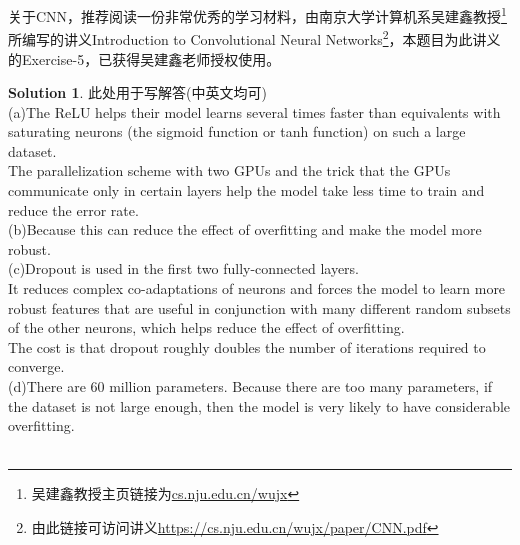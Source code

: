 \documentclass[a4paper,UTF8]{article}
\numberwithin{equation}{section}
\theoremstyle{definition}
\newtheorem*{solution}{Solution}
\begin{document}
关于CNN，推荐阅读一份非常优秀的学习材料，由南京大学计算机系吴建鑫教授\footnote{吴建鑫教授主页链接为\url{cs.nju.edu.cn/wujx}}所编写的讲义Introduction to Convolutional Neural Networks\footnote{由此链接可访问讲义\url{https://cs.nju.edu.cn/wujx/paper/CNN.pdf}}，本题目为此讲义的Exercise-5，已获得吴建鑫老师授权使用。
\begin{solution}
此处用于写解答(中英文均可)\\
(a)The ReLU helps their model learns several times faster than equivalents with saturating neurons (the sigmoid function or tanh function) on such a large dataset.\\
The parallelization scheme with two GPUs and the trick that the GPUs communicate only in certain layers help the model take less time to train and reduce the error rate.\\
(b)Because this can reduce the effect of overfitting and make the model more robust.\\
(c)Dropout is used in the first two fully-connected layers. \\
It reduces complex co-adaptations of neurons and forces the model to learn more robust features that are useful in conjunction with many different random subsets of the other neurons, which helps reduce the effect of overfitting. \\
The cost is that dropout roughly doubles the number of iterations required to converge.\\
(d)There are 60 million parameters. Because there are too many parameters, if the dataset is not large enough, then the model is very likely to have considerable overfitting.\\
~\\
\end{solution}
\end{document}
